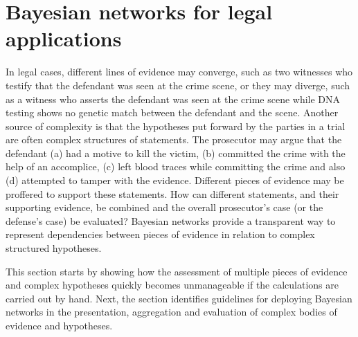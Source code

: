 \documentclass{article}
\begin{document}
\section{Bayesian networks for legal applications}\label{sec:BNs}
 
 
In legal cases, different lines of evidence may converge, such as two witnesses %
who testify that the defendant was seen at the crime scene, or they may diverge, such as a witness who asserts the defendant was seen at the crime scene while DNA testing shows no genetic match between the defendant and the scene. Another source of complexity is that the hypotheses put forward by the parties in a trial are often complex structures of statements. The prosecutor may argue that the defendant (a) had a motive to kill the victim, (b) committed the crime with the help of an accomplice, (c) left blood traces while committing the crime and also (d) attempted to tamper with the evidence. Different pieces of evidence may be proffered to support these  statements. How can different statements, and their supporting evidence, be combined and the overall prosecutor's case (or the defense's case) be evaluated?
%
Bayesian networks %
provide a transparent way to represent dependencies between pieces of evidence in relation to complex structured hypotheses. 

This section starts by showing how the assessment of multiple pieces of evidence and complex hypotheses quickly becomes unmanageable if the calculations are carried out by hand. Next, the section identifies guidelines for deploying Bayesian networks in the presentation, aggregation and evaluation of complex bodies of evidence and 
hypotheses. 


\end{document}
